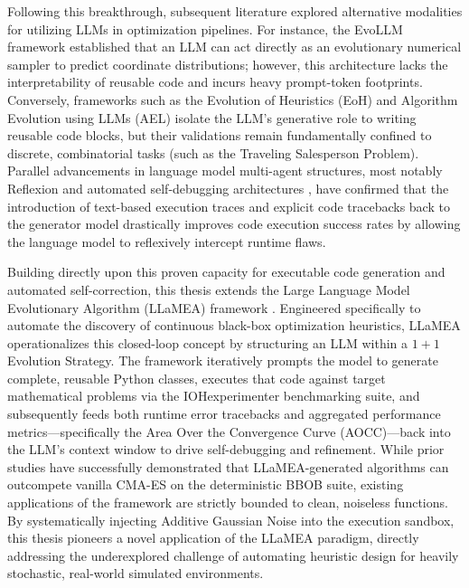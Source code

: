 Following this breakthrough, subsequent literature explored alternative modalities for utilizing LLMs in optimization pipelines. For instance, the EvoLLM framework \cite{Lange2024} established that an LLM can act directly as an evolutionary numerical sampler to predict coordinate distributions; however, this architecture lacks the interpretability of reusable code and incurs heavy prompt-token footprints. Conversely, frameworks such as the Evolution of Heuristics (EoH) \cite{Liu2024} and Algorithm Evolution using LLMs (AEL) \cite{AEL2024} isolate the LLM's generative role to writing reusable code blocks, but their validations remain fundamentally confined to discrete, combinatorial tasks (such as the Traveling Salesperson Problem). Parallel advancements in language model multi-agent structures, most notably Reflexion \cite{Shinn2023} and automated self-debugging architectures \cite{Chen2023}, have confirmed that the introduction of text-based execution traces and explicit code tracebacks back to the generator model drastically improves code execution success rates by allowing the language model to reflexively intercept runtime flaws.


Building directly upon this proven capacity for executable code generation and automated self-correction, this thesis extends the Large Language Model Evolutionary Algorithm (LLaMEA) framework \cite{LLaMEA2024}. Engineered specifically to automate the discovery of continuous black-box optimization heuristics, LLaMEA operationalizes this closed-loop concept by structuring an LLM within a $1+1$ Evolution Strategy. The framework iteratively prompts the model to generate complete, reusable Python classes, executes that code against target mathematical problems via the IOHexperimenter benchmarking suite, and subsequently feeds both runtime error tracebacks and aggregated performance metrics---specifically the Area Over the Convergence Curve (AOCC)---back into the LLM's context window to drive self-debugging and refinement. While prior studies have successfully demonstrated that LLaMEA-generated algorithms can outcompete vanilla CMA-ES on the deterministic BBOB suite, existing applications of the framework are strictly bounded to clean, noiseless functions. By systematically injecting Additive Gaussian Noise into the execution sandbox, this thesis pioneers a novel application of the LLaMEA paradigm, directly addressing the underexplored challenge of automating heuristic design for heavily stochastic, real-world simulated environments.



